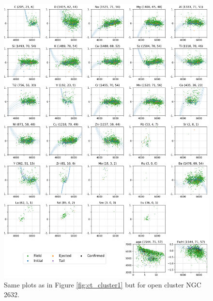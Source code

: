 \begin{figure}
	\centering
	\includegraphics[width=\textwidth]{p_teff_abundances_NGC_2632_orbits_DR3_new_flag0.png}
	\caption{Same plots as in Figure \ref{fig:ct_cluster1} but for open cluster NGC 2632.}
	\label{fig:ct_cluster3}
\end{figure}

